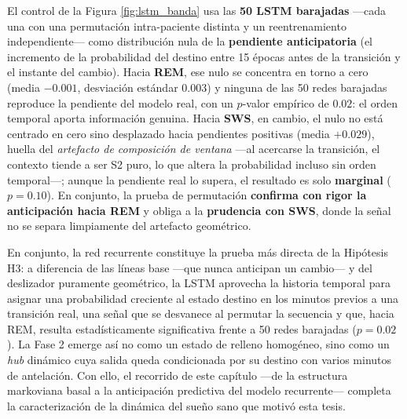 El control de la Figura \ref{fig:lstm_banda} usa las \textbf{50 LSTM barajadas} ---cada una con una permutación intra-paciente distinta y un reentrenamiento independiente--- como distribución nula de la \textbf{pendiente anticipatoria} (el incremento de la probabilidad del destino entre 15 épocas antes de la transición y el instante del cambio). Hacia \textbf{REM}, ese nulo se concentra en torno a cero (media $-0.001$, desviación estándar $0.003$) y ninguna de las 50 redes barajadas reproduce la pendiente del modelo real, con un $p$-valor empírico de $\mathbf{0.02}$: el orden temporal aporta información genuina. Hacia \textbf{SWS}, en cambio, el nulo no está centrado en cero sino desplazado hacia pendientes positivas (media $+0.029$), huella del \textit{artefacto de composición de ventana} ---al acercarse la transición, el contexto tiende a ser S2 puro, lo que altera la probabilidad incluso sin orden temporal---; aunque la pendiente real lo supera, el resultado es solo \textbf{marginal} ($p=0.10$). En conjunto, la prueba de permutación \textbf{confirma con rigor la anticipación hacia REM} y obliga a la \textbf{prudencia con SWS}, donde la señal no se separa limpiamente del artefacto geométrico.

En conjunto, la red recurrente constituye la prueba más directa de la Hipótesis H3: a diferencia de las líneas base ---que nunca anticipan un cambio--- y del deslizador puramente geométrico, la LSTM aprovecha la historia temporal para asignar una probabilidad creciente al estado destino en los minutos previos a una transición real, una señal que se desvanece al permutar la secuencia y que, hacia REM, resulta estadísticamente significativa frente a 50 redes barajadas ($p=0.02$). La Fase 2 emerge así no como un estado de relleno homogéneo, sino como un \textit{hub} dinámico cuya salida queda condicionada por su destino con varios minutos de antelación. Con ello, el recorrido de este capítulo ---de la estructura markoviana basal a la anticipación predictiva del modelo recurrente--- completa la caracterización de la dinámica del sueño sano que motivó esta tesis.
